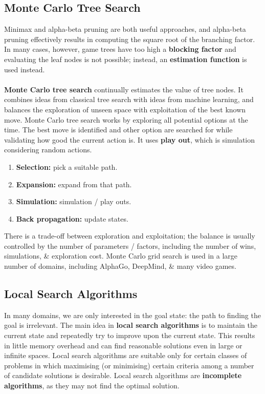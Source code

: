 \documentclass[a4paper,11pt]{article}
\begin{document}
\subsection{Monte Carlo Tree Search}
Minimax and alpha-beta pruning are both useful approaches, and alpha-beta pruning effectively results in computing the square root of the branching factor.
In many cases, however, game trees have too high a \textbf{blocking factor} and evaluating the leaf nodes is not possible; instead, an \textbf{estimation function} is used instead.
\\\\
\textbf{Monte Carlo tree search} continually estimates the value of tree nodes.
It combines ideas from classical tree search with ideas from machine learning, and balances the exploration of unseen space with exploitation of the best known move.
Monte Carlo tree search works by exploring all potential options at the time. 
The best move is identified and other option are searched for while validating how good the current action is.
It uses \textbf{play out}, which is simulation considering random actions.
\begin{enumerate}
    \item   \textbf{Selection:} pick a suitable path.
    \item   \textbf{Expansion:} expand from that path.
    \item   \textbf{Simulation:} simulation / play outs.
    \item   \textbf{Back propagation:} update states.
\end{enumerate}

There is a trade-off between exploration and exploitation; the balance is usually controlled by the number of parameters / factors, including the number of wins, simulations, \& exploration cost.
Monte Carlo grid search is used in a large number of domains, including AlphaGo, DeepMind, \& many video games.

\subsection{Local Search Algorithms}
In many domains, we are only interested in the goal state: the path to finding the goal is irrelevant.
The main idea in \textbf{local search algorithms} is to maintain the current state and repeatedly try to improve upon the current state.
This results in little memory overhead and can find reasonable solutions even in large or infinite spaces.
Local search algorithms are suitable only for certain classes of problems in which maximising (or minimising) certain criteria among a number of candidate solutions is desirable.
Local search algorithms are \textbf{incomplete algorithms}, as they may not find the optimal solution.
\end{document}
